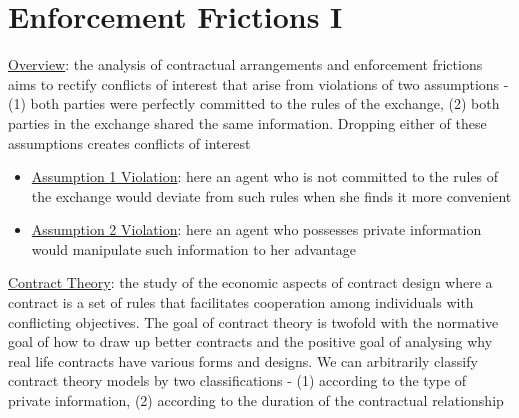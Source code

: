 \documentclass{article}
\begin{document}
\newpage

\section{Enforcement Frictions I}

\vspace{2.5mm}
\par \underline{Overview}: the analysis of contractual arrangements and enforcement frictions aims to rectify conflicts of interest that arise from violations of two assumptions - (1) both parties were perfectly committed to the rules of the exchange, (2) both parties in the exchange shared the same information. Dropping either of these assumptions creates conflicts of interest
\begin{itemize}
    \item  \underline{Assumption 1 Violation}: here an agent who is not committed to the rules of the exchange would deviate from such rules when she finds it more convenient
    \item  \underline{Assumption 2 Violation}: here an agent who possesses private information would manipulate such information to her advantage
\end{itemize}
\vspace{2.5mm}
\par \underline{Contract Theory}: the study of the economic aspects of contract design where a contract is a set of rules that facilitates cooperation among individuals with conflicting objectives. The goal of contract theory is twofold with the normative goal of how to draw up better contracts and the positive goal of analysing why real life contracts have various forms and designs. We can arbitrarily classify contract theory models by two classifications - (1) according to the type of private information, (2) according to the duration of the contractual relationship
\end{document}
